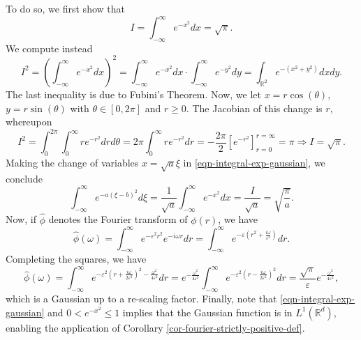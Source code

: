 \documentclass[12pt]{report} %
\begin{document}
To do so, we first show that
\begin{equation}
  I = \int_{- \infty}^{\infty} e^{- x^2} d x = \sqrt{\pi} .
  \label{eqn-integral-exp-gaussian}
\end{equation}
We compute instead
\[ I^2 = \left( \int_{- \infty}^{\infty} e^{- x^2} d x \right)^2 = \int_{-
    \infty}^{\infty} e^{- x^2} d x \cdot \int_{- \infty}^{\infty} e^{- y^2} d
  y = \int_{\mathbb{R}^2} e^{- (x^2 + y^2)} d x d y. \]
The last inequality is due to Fubini's Theorem. Now, we let $x = r \cos
  (\theta)$, $y = r \sin (\theta)$ with $\theta \in [0, 2 \pi]$ and $r \geq
  0$. The Jacobian of this change is $r$, whereupon
\[ I^2 = \int_0^{2 \pi} \int_0^{\infty} r e^{- r^2} d r d \theta = 2 \pi
  \int_0^{\infty} r e^{- r^2} d r = - \frac{2 \pi}{2} [e^{- r^2}]_{r =
    0}^{r = \infty} = \pi \Rightarrow I = \sqrt{\pi} . \]
Making the change of variables $x = \sqrt{a} \xi$ in
\eqref{eqn-integral-exp-gaussian}, we conclude
\[ \int_{- \infty}^{\infty} e^{- a (\xi - b)^2} d \xi = \frac{1}{\sqrt{a}}
  \int_{- \infty}^{\infty} e^{- x^2} d x = \frac{I}{\sqrt{a}} =
  \sqrt{\frac{\pi}{a}} . \]
Now, if $\hat{\phi}$ denotes the Fourier transform of $\phi (r)$, we have
\[ \hat{\phi} (\omega) = \int_{- \infty}^{\infty} e^{- \varepsilon^2 r^2}
  e^{- i \omega r} d r = \int_{- \infty}^{\infty} e^{- \varepsilon \left(
      r^2 + \frac{i \omega}{\varepsilon^2} \right)} d r. \]
Completing the squares, we have
\[ \hat{\phi} (\omega) = \int_{- \infty}^{\infty} e^{- \varepsilon^2 \left(
      r + \frac{i \omega}{2 \varepsilon^2} \right)^2 - \frac{\omega^2}{4
        \varepsilon^2}} d r = e^{- \frac{\omega^2}{4 \varepsilon^2}} \int_{-
    \infty}^{\infty} e^{- \varepsilon^2 \left( r - \frac{i \omega}{2
        \varepsilon^2} \right)^2} d r = \frac{\sqrt{\pi}}{\varepsilon} e^{-
      \frac{\omega^2}{4 \varepsilon^2}}, \]
which is a Gaussian up to a re-scaling factor. Finally, note that
\eqref{eqn-integral-exp-gaussian} and $0 < e^{- x^2} \leq 1$ implies that the
Gaussian function is in $L^1 (\mathbb{R}^d)$, enabling the application of Corollary \ref{cor-fourier-strictly-positive-def}.
\end{document}
